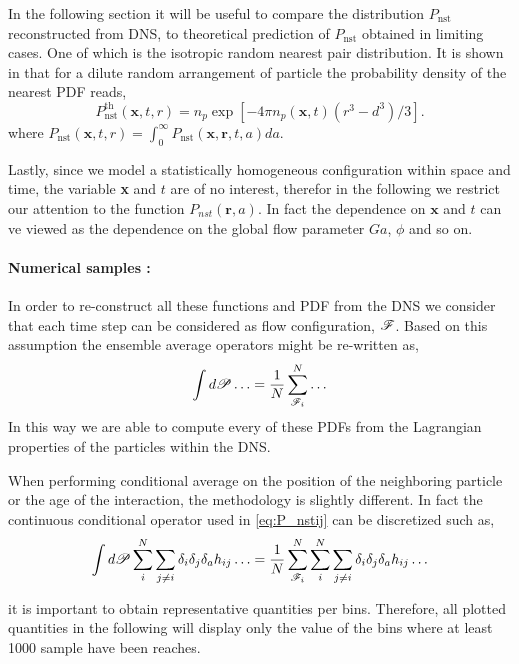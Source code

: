 In the following section it will be useful to compare the distribution $P_\text{nst}$ reconstructed from DNS, to theoretical prediction of $P_\text{nst}$ obtained in limiting cases. 
One of which is the isotropic random nearest pair distribution.
It is shown in \citet{zhang2021ensemble} that for a dilute random arrangement of particle the probability density of the nearest PDF reads, 
\begin{equation}
    P_\text{nst}^\text{th}(\textbf{x},t,r) = n_p \exp[{-4 \pi n_p(\textbf{x},t) (r^3 - d^3)/3}].
    \label{eq:Pnst_dilute}
\end{equation}
where $P_\text{nst}(\textbf{x},t,r) = \int_0^\infty P_\text{nst}(\textbf{x},\textbf{r},t,a) da$.

Lastly, since we model a statistically homogeneous configuration within space and time, the variable \textbf{x} and $t$ are of no interest, therefor in the following we restrict our attention to the function $P_{nst}(\textbf{r},a)$. 
In fact the dependence on $\textbf{x}$ and $t$ can ve viewed as the dependence on the global flow parameter $Ga$, $\phi$ and so on. 


\paragraph*{Numerical samples :}
In order to re-construct all these functions and PDF from the DNS we consider that each time step can be considered as flow configuration, $\mathscr{F}$. 
Based on this assumption the ensemble average operators might be re-written as, 
\begin{equation}
    \int  d\mathscr{P}\ldots
    = \frac{1}{N}\sum_{\mathscr{F}_i}^N \ldots 
\end{equation}
In this way we are able to compute every of these PDFs from the Lagrangian properties of the particles within the DNS. 

When performing conditional average on the position of the neighboring particle or the age of the interaction, the methodology is slightly different. 
In fact the continuous conditional operator used in \ref{eq:P_nstij} can be discretized such as, 
\begin{equation}
    \int  d\mathscr{P} \sum_i^N \sum_{j\neq i}  \delta_i \delta_j \delta_a h_{ij} \ldots
    = \frac{1}{N}\sum_{\mathscr{F}_i}^N 
    \sum_i^N \sum_{j\neq i}  \delta_i \delta_j \delta_a h_{ij}
    \ldots 
\end{equation}

it is important to obtain representative quantities per bins. 
Therefore, all plotted quantities in the following will display only the value of the bins where at least 1000 sample have been reaches. 





